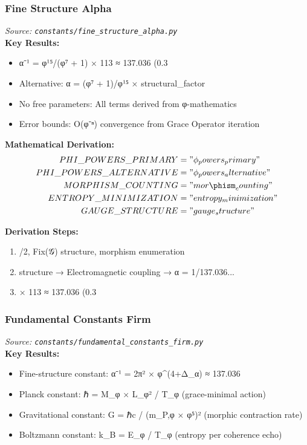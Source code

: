 \subsubsection{Fine Structure Alpha}
\textit{Source: \texttt{constants/fine_structure_alpha.py}}\\

\textbf{Key Results:}
\begin{itemize}
    \item α⁻¹ = φ¹⁵/(φ⁷ + 1) × 113 ≈ 137.036 (0.3%
    \item Alternative: α = (φ⁷ + 1)/φ¹⁵ × structural_factor
    \item No free parameters: All terms derived from φ-mathematics
    \item Error bounds: O(φ⁻ⁿ) convergence from Grace Operator iteration
\end{itemize}

\textbf{Mathematical Derivation:}
\begin{align}
    PHI\_POWERS\_PRIMARY &= "\phi_powers_primary" \\
    PHI\_POWERS\_ALTERNATIVE &= "\phi_powers_alternative" \\
    MORPHISM\_COUNTING &= "mor\phism_counting" \\
    ENTROPY\_MINIMIZATION &= "entropy_minimization" \\
    GAUGE\_STRUCTURE &= "gauge_structure" \\
\end{align}

\textbf{Derivation Steps:}
\begin{enumerate}
    \item /2, Fix(𝒢) structure, morphism enumeration
    \item structure → Electromagnetic coupling → α = 1/137.036...
    \item × 113 ≈ 137.036 (0.3%
\end{enumerate}

\subsubsection{Fundamental Constants Firm}
\textit{Source: \texttt{constants/fundamental_constants_firm.py}}\\

\textbf{Key Results:}
\begin{itemize}
    \item Fine-structure constant: α⁻¹ = 2π² × φ^(4+Δ_α) ≈ 137.036
    \item Planck constant: ℏ = M_φ × L_φ² / T_φ (grace-minimal action)
    \item Gravitational constant: G = ℏc / (m_P,φ × φ⁵)² (morphic contraction rate)
    \item Boltzmann constant: k_B = E_φ / T_φ (entropy per coherence echo)
\end{itemize}

